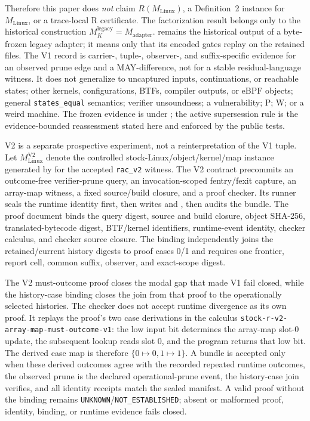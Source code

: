 \documentclass[conference]{IEEEtran}
\begin{document}
Therefore this paper does \emph{not} claim $R(M_{\mathrm{Linux}})$, a Definition~2 instance for $M_{\mathrm{Linux}}$, or a trace-local R certificate. The factorization result belongs only to the historical construction $M_K^{\mathrm{legacy}}=M_{\mathrm{adapter}}$.  remains the historical output of a byte-frozen legacy adapter; it means only that its encoded gates replay on the retained files. The V1 record is carrier-, tuple-, observer-, and suffix-specific evidence for an observed prune edge and a MAY-difference, not for a stable residual-language witness. It does not generalize to uncaptured inputs, continuations, or reachable states; other kernels, configurations, BTFs, compiler outputs, or eBPF objects; general \texttt{states\_equal} semantics; verifier unsoundness; a vulnerability; P; W; or a weird machine. The frozen evidence is under ; the active supersession rule is the evidence-bounded reassessment stated here and enforced by the public tests.

V2 is a separate prospective experiment, not a reinterpretation of the V1 tuple. Let $M_{\mathrm{Linux}}^{\mathrm{V2}}$ denote the controlled stock-Linux/object/kernel/map instance generated by  for the accepted \texttt{rac\_v2} witness. The V2 contract precommits an outcome-free verifier-prune query, an invocation-scoped fentry/fexit capture, an array-map witness, a fixed source/build closure, and a proof checker. Its runner seals the runtime identity first, then writes  and , then audits the bundle. The proof document binds the query digest, source and build closure, object SHA-256, translated-bytecode digest, BTF/kernel identifiers, runtime-event identity, checker calculus, and checker source closure. The binding independently joins the retained/current history digests to proof cases 0/1 and requires one frontier, report cell, common suffix, observer, and exact-scope digest.

The V2 must-outcome proof closes the modal gap that made V1 fail closed, while the history-case binding closes the join from that proof to the operationally selected histories. The checker does not accept runtime divergence as its own proof. It replays the proof's two case derivations in the calculus \texttt{stock-r-v2-array-map-must-outcome-v1}: the low input bit determines the array-map slot-0 update, the subsequent lookup reads slot 0, and the program returns that low bit. The derived case map is therefore $\{0\mapsto0,1\mapsto1\}$. A bundle is accepted only when these derived outcomes agree with the recorded repeated runtime outcomes, the observed prune is the declared operational-prune event, the history-case join verifies, and all identity receipts match the sealed manifest. A valid proof without the binding remains \texttt{UNKNOWN}/\texttt{NOT\_ESTABLISHED}; absent or malformed proof, identity, binding, or runtime evidence fails closed.
\end{document}
